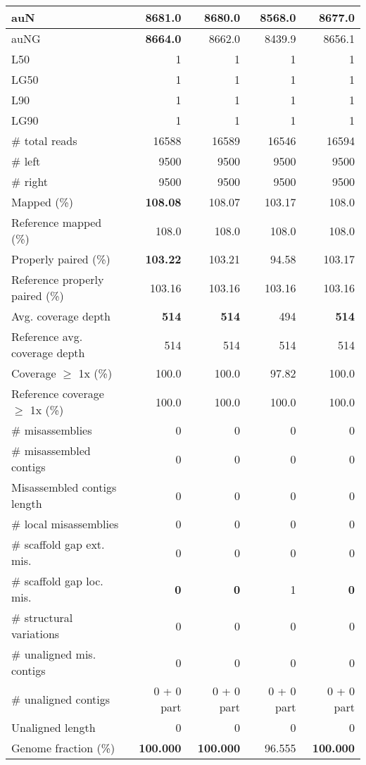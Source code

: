\documentclass[12pt,a4paper]{article}
\begin{document}
\begin{table}[ht]
\begin{center}
\begin{tabular}{|l*{4}{|r}|}
auN & {\bf 8681.0} & 8680.0 & 8568.0 & 8677.0 \\ \hline
auNG & {\bf 8664.0} & 8662.0 & 8439.9 & 8656.1 \\ \hline
L50 & 1 & 1 & 1 & 1 \\ \hline
LG50 & 1 & 1 & 1 & 1 \\ \hline
L90 & 1 & 1 & 1 & 1 \\ \hline
LG90 & 1 & 1 & 1 & 1 \\ \hline
\# total reads & 16588 & 16589 & 16546 & 16594 \\ \hline
\# left & 9500 & 9500 & 9500 & 9500 \\ \hline
\# right & 9500 & 9500 & 9500 & 9500 \\ \hline
Mapped (\%) & {\bf 108.08} & 108.07 & 103.17 & 108.0 \\ \hline
Reference mapped (\%) & 108.0 & 108.0 & 108.0 & 108.0 \\ \hline
Properly paired (\%) & {\bf 103.22} & 103.21 & 94.58 & 103.17 \\ \hline
Reference properly paired (\%) & 103.16 & 103.16 & 103.16 & 103.16 \\ \hline
Avg. coverage depth & {\bf 514} & {\bf 514} & 494 & {\bf 514} \\ \hline
Reference avg. coverage depth & 514 & 514 & 514 & 514 \\ \hline
Coverage $\geq$ 1x (\%) & 100.0 & 100.0 & 97.82 & 100.0 \\ \hline
Reference coverage $\geq$ 1x (\%) & 100.0 & 100.0 & 100.0 & 100.0 \\ \hline
\# misassemblies & 0 & 0 & 0 & 0 \\ \hline
\# misassembled contigs & 0 & 0 & 0 & 0 \\ \hline
Misassembled contigs length & 0 & 0 & 0 & 0 \\ \hline
\# local misassemblies & 0 & 0 & 0 & 0 \\ \hline
\# scaffold gap ext. mis. & 0 & 0 & 0 & 0 \\ \hline
\# scaffold gap loc. mis. & {\bf 0} & {\bf 0} & 1 & {\bf 0} \\ \hline
\# structural variations & 0 & 0 & 0 & 0 \\ \hline
\# unaligned mis. contigs & 0 & 0 & 0 & 0 \\ \hline
\# unaligned contigs & 0 + 0 part & 0 + 0 part & 0 + 0 part & 0 + 0 part \\ \hline
Unaligned length & 0 & 0 & 0 & 0 \\ \hline
Genome fraction (\%) & {\bf 100.000} & {\bf 100.000} & 96.555 & {\bf 100.000} \\ \hline

\end{tabular}
\end{center}
\end{table}
\end{document}
